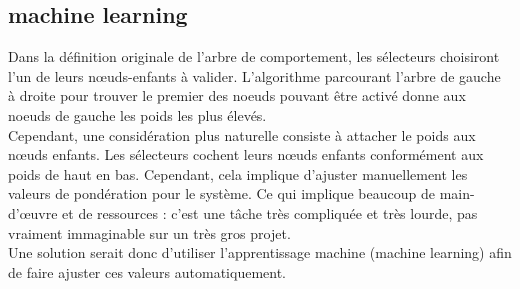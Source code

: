\documentclass[titlepage]{article}
\begin{document}
		\subsection{machine learning}
		Dans la définition originale de l’arbre de comportement, les sélecteurs choisiront l’un de leurs nœuds-enfants à valider. L’algorithme parcourant l'arbre de gauche à droite pour trouver le premier des noeuds pouvant être activé donne aux noeuds de gauche les poids les plus élevés. \cite{Fu2016/08}
		\\
		Cependant, une considération plus naturelle consiste à attacher le poids aux nœuds enfants. Les sélecteurs cochent leurs nœuds enfants conformément aux poids de haut en bas. Cependant, cela implique d'ajuster manuellement les valeurs de pondération pour le système. Ce qui implique beaucoup de main-d'œuvre et de ressources : c'est une tâche très compliquée et très lourde, pas vraiment immaginable sur un très gros projet. \cite{Fu2016/08}
		\\
		Une solution serait donc d'utiliser l'apprentissage machine (machine learning) afin de faire ajuster ces valeurs automatiquement.
	
\end{document}
